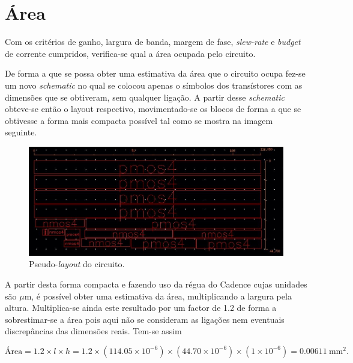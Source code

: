 \documentclass[11pt]{article}
\numberwithin{equation}{section}
\begin{document}
\pagebreak

\section{Área}

Com os critérios de ganho, largura de banda, margem de fase, \textit{slew-rate} e \textit{budget} de corrente cumpridos, verifica-se qual a área ocupada pelo circuito.

De forma a que se possa obter uma estimativa da área que o circuito ocupa fez-se um novo \textit{schematic} no qual se colocou apenas o símbolos dos transístores com as dimensões que se obtiveram, sem qualquer ligação. A partir desse \textit{schematic} obteve-se então o layout respectivo, movimentado-se os blocos de forma a que se obtivesse a forma mais compacta possível tal como se mostra na imagem seguinte.

\begin{figure}[H]
	\centering
	\includegraphics[keepaspectratio=true, scale=0.45]{exps/area}
	\vspace{-0.5em}
	\caption{Pseudo-\textit{layout} do circuito.}
	\vspace{-0.8em}
\end{figure}

A partir desta forma compacta e fazendo uso da régua do Cadence cujas unidades são $\mu$m, é possível obter uma estimativa da área, multiplicando a largura pela altura. Multiplica-se ainda este resultado por um factor de 1.2 de forma a sobrestimar-se a área pois aqui não se consideram as ligações nem eventuais discrepâncias das dimensões reais. Tem-se assim

\vspace{-7mm}
\begin{equation}
\text{Área} = 1.2\times l\times h = 1.2\times\left(114.05 \times 10^{-6}\right) \times \left(44.70 \times 10^{-6}\right) \times \left(1 \times 10^{-6}\right) = 0.00611~\text{mm}^2.
\end{equation}
\end{document}
